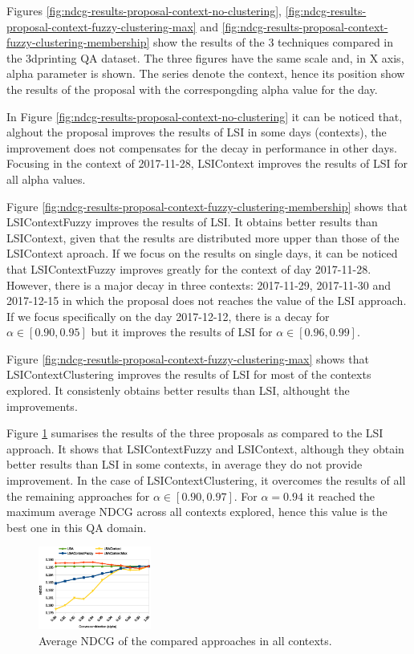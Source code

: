\documentclass[preprint]{elsarticle}
\begin{document}
\begin{spacing}{1.5}
Figures \ref{fig:ndcg-results-proposal-context-no-clustering}, \ref{fig:ndcg-results-proposal-context-fuzzy-clustering-max} and \ref{fig:ndcg-results-proposal-context-fuzzy-clustering-membership} show the results of the 3 techniques compared in the 3dprinting QA dataset. The three figures have the same scale and, in X axis, alpha parameter is shown. The series denote the context, hence its position show the results of the proposal with the correspongding alpha value for the day.

In Figure \ref{fig:ndcg-results-proposal-context-no-clustering} it can be noticed that, alghout the proposal improves the results of LSI in some days (contexts), the improvement does not compensates for the decay in performance in other days. Focusing in the context of 2017-11-28, LSIContext improves the results of LSI for all alpha values.

Figure \ref{fig:ndcg-results-proposal-context-fuzzy-clustering-membership} shows that LSIContextFuzzy improves the results of LSI. It obtains better results than LSIContext, given that the results are distributed more upper than those of the LSIContext aproach. If we focus on the results on single days, it can be noticed that LSIContextFuzzy improves greatly for the context of day 2017-11-28. However, there is a major decay in three contexts: 2017-11-29, 2017-11-30 and 2017-12-15 in which the proposal does not reaches the value of the LSI approach. If we focus specifically on the day 2017-12-12, there is a decay for $\alpha \in [0.90,0.95]$ but it improves the results of LSI for $\alpha \in [0.96,0.99]$.

Figure \ref{fig:ndcg-resutls-proposal-context-fuzzy-clustering-max} shows that LSIContextClustering improves the results of LSI for most of the contexts explored. It consistenly obtains better results than LSI, althought the improvements.

Figure \ref{fig:ndcg-results-3proposals-average} sumarises the results of the three proposals as compared to the LSI approach. It shows that LSIContextFuzzy and LSIContext, although they obtain better results than LSI in some contexts, in average they do not provide improvement. In the case of LSIContextClustering, it overcomes the results of all the remaining approaches for $\alpha \in [0.90,0.97]$. For $\alpha=0.94$ it reached the maximum average NDCG across all contexts explored, hence this value is the best one in this QA domain.

\begin{figure}[htb]
    \centering
    \includegraphics[width=0.33\textwidth]{figures/ndcg-results-3proposals-average.eps}
    \caption{Average NDCG of the compared approaches in all contexts.}
    \label{fig:ndcg-results-3proposals-average}
\end{figure}


\end{spacing}
\end{document}

